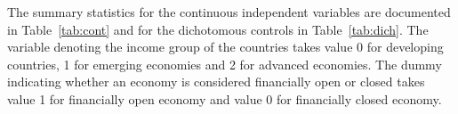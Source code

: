 \documentclass[12pt,a4paper]{article}
\begin{document}

The summary statistics for the continuous independent variables are documented in Table~\ref{tab:cont} and for the dichotomous controls in Table~\ref{tab:dich}. The variable denoting the income group of the countries takes value 0 for developing countries, 1 for emerging economies and 2 for advanced economies. The dummy indicating whether an economy is considered financially open or closed takes value 1 for financially open economy and value 0 for financially closed economy.

\end{document}
